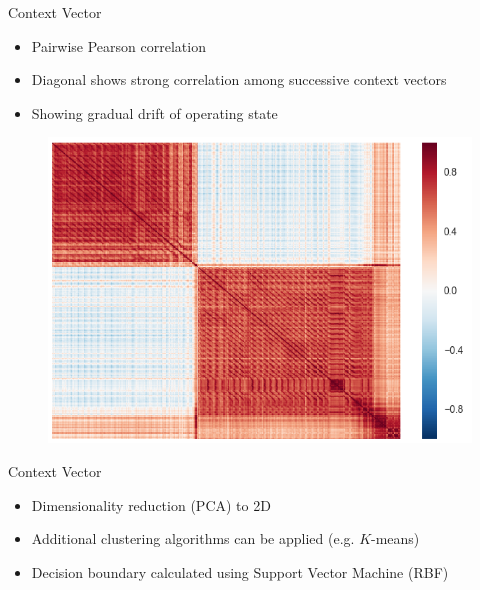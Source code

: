 \documentclass{beamer}
\begin{document}
\begin{frame}[shrink]{Context Vector}
  \begin{itemize}
    \item Pairwise Pearson correlation
    \item Diagonal shows strong correlation among successive context vectors
    \item Showing gradual drift of operating state
  \end{itemize}
  \begin{figure}[H]
  	\centering
  	\includegraphics[width=1\textwidth]{matrix.PNG}
  \end{figure}
\end{frame}


\begin{frame}{Context Vector}
  \begin{itemize}
    \item Dimensionality reduction (PCA) to 2D
    \item Additional clustering algorithms can be applied (e.g. \(K\)-means)
    \item Decision boundary calculated using Support Vector Machine (RBF)
  \end{itemize}
\end{frame}
\end{document}
